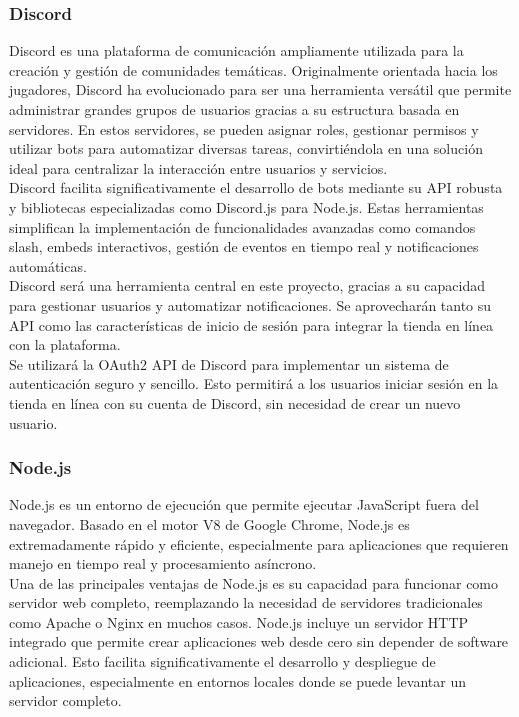\documentclass[a4paper,12pt]{article}
\begin{document}
\subsubsection{Discord}

Discord es una plataforma de comunicación ampliamente utilizada para la creación y gestión de comunidades temáticas. Originalmente orientada hacia los jugadores, Discord ha evolucionado para ser una herramienta versátil que permite administrar grandes grupos de usuarios gracias a su estructura basada en servidores. En estos servidores, se pueden asignar roles, gestionar permisos y utilizar bots para automatizar diversas tareas, convirtiéndola en una solución ideal para centralizar la interacción entre usuarios y servicios.\\

Discord facilita significativamente el desarrollo de bots mediante su API robusta y bibliotecas especializadas como Discord.js para Node.js. Estas herramientas simplifican la implementación de funcionalidades avanzadas como comandos slash, embeds interactivos, gestión de eventos en tiempo real y notificaciones automáticas.\\

Discord será una herramienta central en este proyecto, gracias a su capacidad para gestionar usuarios y automatizar notificaciones. Se aprovecharán tanto su API como las características de inicio de sesión para integrar la tienda en línea con la plataforma.\\

Se utilizará la OAuth2 API de Discord para implementar un sistema de autenticación seguro y sencillo. Esto permitirá a los usuarios iniciar sesión en la tienda en línea con su cuenta de Discord, sin necesidad de crear un nuevo usuario.

\newpage

\subsubsection{Node.js}

Node.js es un entorno de ejecución que permite ejecutar JavaScript fuera del navegador. Basado en el motor V8 de Google Chrome, Node.js es extremadamente rápido y eficiente, especialmente para aplicaciones que requieren manejo en tiempo real y procesamiento asíncrono.\\

Una de las principales ventajas de Node.js es su capacidad para funcionar como servidor web completo, reemplazando la necesidad de servidores tradicionales como Apache o Nginx en muchos casos. Node.js incluye un servidor HTTP integrado que permite crear aplicaciones web desde cero sin depender de software adicional. Esto facilita significativamente el desarrollo y despliegue de aplicaciones, especialmente en entornos locales donde se puede levantar un servidor completo.\\
\end{document}
